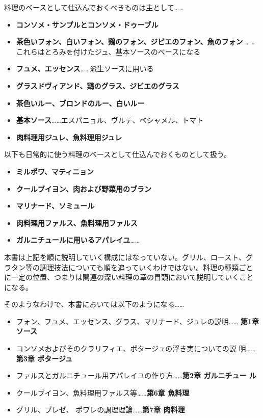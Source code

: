 料理のベースとして仕込んでおくべきものは主として\ldots{}\ldots{}

\begin{itemize}
\tightlist
\item
  \textbf{コンソメ・サンプルとコンソメ・ドゥーブル}
\item
  \textbf{茶色いフォン、白いフォン、鶏のフォン、ジビエのフォン、魚のフォン
  }\ldots{}\ldots{}これらはとろみを付けたジュ、基本ソースのベースになる
\item
  \textbf{フュメ、エッセンス}\ldots{}\ldots{}派生ソースに用いる
\item
  \textbf{グラスドヴィアンド、鶏のグラス、ジビエのグラス}
\item
  \textbf{茶色いルー、ブロンドのルー、白いルー}
\item
  \textbf{基本ソース}\ldots{}\ldots{}エスパニョル、ヴルテ、ベシャメル、トマト
\item
  \textbf{肉料理用ジュレ、魚料理用ジュレ}
\end{itemize}

以下も日常的に使う料理のベースとして仕込んでおくものとして扱う。

\begin{itemize}
\tightlist
\item
  \textbf{ミルポワ、マティニョン}
\item
  \textbf{クールブイヨン、肉および野菜用のブラン}
\item
  \textbf{マリナード、ソミュール}
\item
  \textbf{肉料理用ファルス、魚料理用ファルス}
\item
  \textbf{ガルニチュールに用いるアパレイユ}\ldots{}\ldots{}
\end{itemize}

本書は上記を順に説明していく構成にはなっていない。グリル、ロースト、グ
ラタン等の調理技法についても順を追っていくわけではない。料理の種類ごと
に一定の位置、つまりは関連の深い料理の章の冒頭において説明していくこと
になる。

そのようなわけで、本書においては以下のようになる\ldots{}\ldots{}

\begin{itemize}
\tightlist
\item
  フォン、フュメ、エッセンス、グラス、マリナード、ジュレの説明\ldots{}\ldots{}
  \textbf{ 第1章 ソース}
\item
  コンソメおよびそのクラリフィエ、ポタージュの浮き実についての説
  明\ldots{}\ldots{}\textbf{第3章 ポタージュ}
\item
  ファルスとガルニチュール用アパレイユの作り方\ldots{}\ldots{}\textbf{第2章
  ガルニチュー ル}
\item
  クールブイヨン、魚料理用ファルス等\ldots{}\ldots{}\textbf{第6章
  魚料理}
\item
  グリル、ブレゼ、 ポワレの調理理論\ldots{}\ldots{}\textbf{第7章 肉料理}
\end{itemize}

